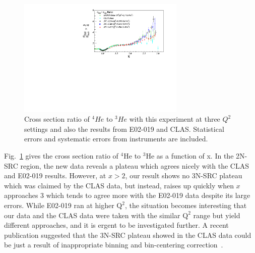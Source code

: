 
		\begin{figure}[!ht]
		\begin{center}
		\includegraphics[width=8.0cm]{./figures/He4_He3_XS_Ratio_DpTh40_DpTh40_L.pdf}
		\end{center}
		\vspace*{-5mm}
		\caption{Cross section ratio of $^{4}He$ to $^{3}He$ with this experiment at three $Q^{2}$ settings and also the results from E02-019 and CLAS. Statistical errors and systematic errors from instruments are included.}
		\label{he4_he3}
		\end{figure}
		Fig.~\ref{he4_he3} gives the cross section ratio of $\mathrm{^{4}He}$ to $\mathrm{^{3}He}$ as a function of x. In the 2N-SRC region, the new data reveals a plateau which agrees nicely with the CLAS and E02-019 results. However, at $x>2$, our result shows no 3N-SRC plateau which was claimed by the CLAS data, but instead, raises up quickly when $x$ approaches 3 which tends to agree more with the E02-019 data despite its large errors. While E02-019 ran at higher $\mathrm{Q^{2}}$, the situation becomes interesting that our data and the CLAS data were taken with the similar $\mathrm{Q^{2}}$ range but yield different approaches, and it is ergent to be investigated further. A recent publication suggested that the 3N-SRC plateau showed in the CLAS data could be just a result of inappropriate binning and bin-centering correction~\cite{doug_or_clas}. 

